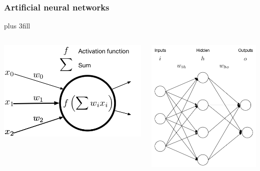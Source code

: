 \documentclass{beamer}
\begin{document}
\begin{frame}[fragile]\frametitle{Artificial neural networks}
\vskip0pt plus 3fill
\begin{columns}
\begin{column}{0.5\textwidth}
\includegraphics[width=\linewidth]{neuron.png}
\end{column}
\vrule
\begin{column}{0.5\textwidth}
\includegraphics[width=\linewidth]{ann.png}
\end{column}
\end{columns}
\end{frame}
\end{document}

